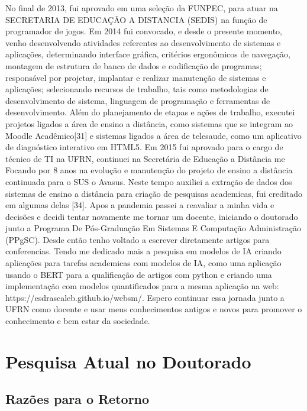 \documentclass[10pt,a4paper,oneside]{book}
\begin{document}
No final de 2013, fui aprovado em uma seleção da FUNPEC, para atuar na SECRETARIA DE EDUCAÇÃO A DISTANCIA (SEDIS) na função de programador de jogos. Em 2014 fui convocado, e desde o presente momento, venho desenvolvendo atividades referentes ao desenvolvimento de sistemas e aplicações, determinando interface gráfica, critérios ergonômicos de navegação, montagem de estrutura de banco de dados e codificação de programas; responsável por projetar, implantar e realizar manutenção de sistemas e aplicações; selecionando recursos de trabalho, tais como metodologias de desenvolvimento de sistema, linguagem de programação e ferramentas de desenvolvimento.
Além do planejamento de etapas e ações de trabalho, executei projetos ligados a área de ensino a distância, como sistemas que se integram ao Moodle Acadêmico[31] e sistemas ligados a área de telesaude, como um aplicativo de diagnóstico interativo em HTML5.
Em 2015 fui aprovado para o cargo de técnico de TI na UFRN, continuei na Secretária de Educação a Distância me Focando por 8 anos na evolução e manutenção do projeto de ensino a distância continuada para o SUS o Avasus. Neste tempo auxiliei a extração de dados dos sistemas de ensino a distância para criação de pesquisas academicas, fui creditado em algumas delas [34].
Apos a pandemia passei a reavaliar a minha vida e decisões e decidi tentar novamente me tornar um docente, iniciando o doutorado junto a Programa De Pós-Graduação Em Sistemas E Computação Administração (PPgSC). Desde então tenho voltado a escrever diretamente artigos para conferencias. Tendo me dedicado mais a pesquisa em modelos de IA criando aplicações para tarefas academicas com modelos de IA, como uma aplicação usando o BERT para a qualificação de artigos com python e criando uma implementação com modelos quantificados para a mesma aplicação na web: https://esdrascaleb.github.io/websm/.
Espero continuar essa jornada junto a UFRN como docente e usar meus conhecimentos antigos e novos para promover o conhecimento e bem estar da sociedade.




\chapter{Pesquisa Atual no Doutorado}
\label{cap_pesquisa}


\section{Razões para o Retorno}
\end{document}
